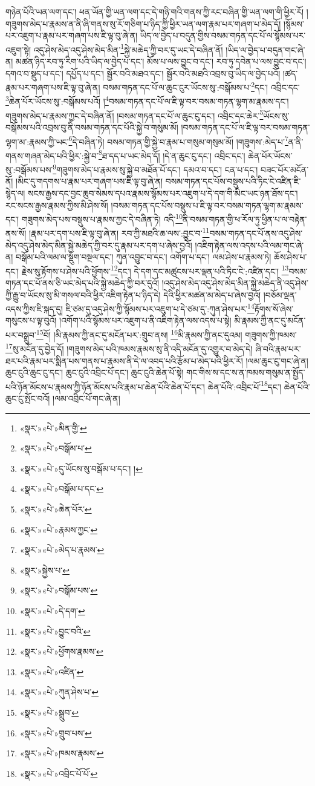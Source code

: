 གཉེན་པོའི་ཡན་ལག་དང་། ཕན་ཡོན་གྱི་ཡན་ལག་དང་དེ་གཉི་གའི་གནས་ཀྱི་རང་བཞིན་གྱི་ཡན་ལག་གི་ཕྱིར་རོ། །གཟུགས་མེད་པ་རྣམས་ན་ནི་ཞི་གནས་སུ་རོ་གཅིག་པ་ཉིད་ཀྱི་ཕྱིར་ཡན་ལག་རྣམ་པར་གཞག་པ་མེད་དོ། །སྙོམས་པར་འཇུག་པ་རྣམ་པར་གཞག་པས་ཇི་ལྟ་བུ་ཞེ་ན། ཡིད་ལ་བྱེད་པ་བདུན་གྱིས་བསམ་གཏན་དང་པོ་ལ་སྙོམས་པར་འཇུག་སྟེ། འདུ་ཤེས་མེད་འདུ་ཤེས་མེད་མིན་\footnote{«སྣར་»«པེ་»མིན་གྱི་}སྐྱེ་མཆེད་ཀྱི་བར་དུ་ཡང་དེ་བཞིན་ནོ། །ཡིད་ལ་བྱེད་པ་བདུན་གང་ཞེ་ན། མཚན་ཉིད་རབ་ཏུ་རིག་པའི་ཡིད་ལ་བྱེད་པ་དང་། མོས་པ་ལས་བྱུང་བ་དང་། རབ་ཏུ་དབེན་པ་ལས་བྱུང་བ་དང་། དགའ་བ་སྡུད་པ་དང་། དཔྱོད་པ་དང་། སྦྱོར་བའི་མཐའ་དང་། སྦྱོར་བའི་མཐའི་འབྲས་བུ་ཡིད་ལ་བྱེད་པའོ། །ཚད་རྣམ་པར་གཞག་པས་ཇི་ལྟ་བུ་ཞེ་ན། བསམ་གཏན་དང་པོ་ལ་ཆུང་ངུར་ཡོངས་སུ་:བསྒོམས་པ་\footnote{«སྣར་»«པེ་»བསྒོམ་པ་}དང་། འབྲིང་དང་\footnote{«སྣར་»«པེ་»དུ་ཡོངས་སུ་བསྒོམ་པ་དང་། །}ཆེན་པོར་ཡོངས་སུ་:བསྒོམས་པའོ། །\footnote{«སྣར་»«པེ་»བསྒོམ་པ་དང་}བསམ་གཏན་དང་པོ་ལ་ཇི་ལྟ་བར་བསམ་གཏན་ལྷག་མ་རྣམས་དང་། གཟུགས་མེད་པ་རྣམས་ཀྱང་དེ་བཞིན་ནོ། །བསམ་གཏན་དང་པོ་ལ་ཆུང་ངུ་དང་། འབྲིང་དང་ཆེར་\footnote{«སྣར་»«པེ་»ཆེན་པོར་}ཡོངས་སུ་བསྒོམས་པའི་འབྲས་བུ་ནི་བསམ་གཏན་དང་པོའི་སྐྱེ་བ་གསུམ་མོ། །བསམ་གཏན་དང་པོ་ལ་ཇི་ལྟ་བར་བསམ་གཏན་ལྷག་མ་:རྣམས་ཀྱི་ཡང་\footnote{«སྣར་»«པེ་»རྣམས་ཀྱང་}དེ་བཞིན་ཏེ། བསམ་གཏན་གྱི་སྐྱེ་བ་རྣམ་པ་གསུམ་གསུམ་མོ། །གཟུགས་:མེད་པ་\footnote{«སྣར་»«པེ་»མེད་པ་རྣམས་}ན་ནི་གནས་གཞན་མེད་པའི་ཕྱིར་:སྐྱེ་བ་\footnote{«སྣར་»སྐྱེས་པ་}ཐ་དད་པ་ཡང་མེད་དོ། །དེ་ན་ཆུང་ངུ་དང་། འབྲིང་དང་། ཆེན་པོར་ཡོངས་སུ་:བསྒོམས་པས་\footnote{«སྣར་»«པེ་»བསྒོམ་པས་}གཟུགས་མེད་པ་རྣམས་སུ་སྐྱེ་བ་མཐོན་པོ་དང་། དམའ་བ་དང་། ངན་པ་དང་། བཟང་པོར་མངོན་ནོ། །མིང་དུ་གདགས་པ་རྣམ་པར་གཞག་པས་ཇི་ལྟ་བུ་ཞེ་ན། བསམ་གཏན་དང་པོས་བསྡུས་པའི་ཏིང་ངེ་འཛིན་ཇི་སྙེད་ལ། སངས་རྒྱས་དང་བྱང་ཆུབ་སེམས་དཔའ་རྣམས་སྙོམས་པར་འཇུག་པ་དེ་དག་གི་མིང་ཡང་ཉན་ཐོས་དང་། རང་སངས་རྒྱས་རྣམས་ཀྱིས་མི་ཤེས་སོ། །བསམ་གཏན་དང་པོས་བསྡུས་པ་ཇི་ལྟ་བར་བསམ་གཏན་ལྷག་མ་རྣམས་དང་། གཟུགས་མེད་པས་བསྡུས་པ་རྣམས་ཀྱང་དེ་བཞིན་ཏེ། འདི་\footnote{«སྣར་»«པེ་»དེ་དག་}ནི་བསམ་གཏན་གྱི་ཕ་རོལ་ཏུ་ཕྱིན་པ་ལ་བརྟེན་ནས་སོ། །རྣམ་པར་དག་པས་ཇི་ལྟ་བུ་ཞེ་ན། རབ་ཀྱི་མཐའི་ཆ་ལས་:བྱུང་བ་\footnote{«སྣར་»«པེ་»བྱུང་བའི་}བསམ་གཏན་དང་པོ་ནས་འདུ་ཤེས་མེད་འདུ་ཤེས་མེད་མིན་སྐྱེ་མཆེད་ཀྱི་བར་དུ་རྣམ་པར་དག་པ་ཞེས་བྱའོ། །འཇིག་རྟེན་ལས་འདས་པའི་ལམ་གང་ཞེ་ན། བསྒོམ་པའི་ལམ་ལ་སྡུག་བསྔལ་དང་། ཀུན་འབྱུང་བ་དང་། འགོག་པ་དང་། ལམ་ཤེས་པ་རྣམས་ཏེ། ཆོས་ཤེས་པ་དང་། རྗེས་སུ་རྟོགས་པ་ཤེས་པའི་ཕྱོགས་\footnote{«སྣར་»«པེ་»ཕྱོགས་རྣམས་}དང་། དེ་དག་དང་མཚུངས་པར་ལྡན་པའི་ཏིང་ངེ་:འཛིན་དང་། \footnote{«སྣར་»«པེ་»འཛིན་}བསམ་གཏན་དང་པོ་ནས་ཅི་ཡང་མེད་པའི་སྐྱེ་མཆེད་ཀྱི་བར་དུའོ། །འདུ་ཤེས་མེད་འདུ་ཤེས་མེད་མིན་སྐྱེ་མཆེད་ནི་འདུ་ཤེས་ཀྱི་རྒྱུ་བ་ཡོངས་སུ་མི་གསལ་བའི་ཕྱིར་འཇིག་རྟེན་པ་ཉིད་དེ། དེའི་ཕྱིར་མཚན་མ་མེད་པ་ཞེས་བྱའོ། །བཅོམ་ལྡན་འདས་ཀྱིས་ཇི་སྐད་དུ། ཇི་ཙམ་དུ་འདུ་ཤེས་ཀྱི་སྙོམས་པར་འཇུག་པ་དེ་ཙམ་དུ་:ཀུན་ཤེས་པར་\footnote{«སྣར་»«པེ་»ཀུན་ཤེས་པ་}རྟོགས་སོ་ཞེས་གསུངས་པ་ལྟ་བུའོ། །འགོག་པའི་སྙོམས་པར་འཇུག་པ་ནི་འཇིག་རྟེན་ལས་འདས་པ་སྟེ། མི་རྣམས་ཀྱི་ནང་དུ་མངོན་པར་བསྒྲུབ་\footnote{«སྣར་»«པེ་»སྒྲུབ་}བོ། །མི་རྣམས་ཀྱི་ནང་དུ་མངོན་པར་:གྲུབ་ནས། \footnote{«སྣར་»«པེ་»གྲུབ་པས་}མི་རྣམས་ཀྱི་ནང་དུའམ། གཟུགས་ཀྱི་ཁམས་\footnote{«སྣར་»«པེ་»ཁམས་རྣམས་}སུ་མངོན་དུ་བྱེད་དོ། །གཟུགས་མེད་པའི་ཁམས་རྣམས་སུ་ནི་འདི་མངོན་དུ་འགྱུར་བ་མེད་དེ། ཞི་བའི་རྣམ་པར་ཐར་པའི་རྣམ་པར་སྨིན་པས་གནས་པ་རྣམས་ནི་དེ་ལ་འབད་པའི་རྩོམ་པ་མེད་པའི་ཕྱིར་རོ། །ལམ་ཆུང་ངུ་གང་ཞེ་ན། ཆུང་ངུའི་ཆུང་ངུ་དང་། ཆུང་ངུའི་འབྲིང་པོ་དང་། ཆུང་ངུའི་ཆེན་པོ་སྟེ། གང་གིས་ས་དང་ས་ན་ཁམས་གསུམ་ན་སྤྱོད་པའི་ཉོན་མོངས་པ་རྣམས་ཀྱི་ཉོན་མོངས་པའི་རྣམ་པ་ཆེན་པོའི་ཆེན་པོ་དང་། ཆེན་པོའི་:འབྲིང་པོ་\footnote{«སྣར་»«པེ་»འབྲིང་པོ་པོ་}དང་། ཆེན་པོའི་ཆུང་ངུ་སྤོང་བའོ། །ལམ་འབྲིང་པོ་གང་ཞེ་ན། 